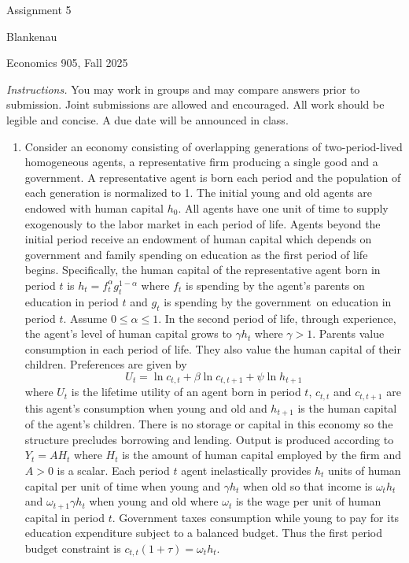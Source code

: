 \documentclass[12pt]{article}
\begin{document}
\begin{center}
{\LARGE Assignment 5}
\end{center}

\noindent Blankenau

\noindent Economics 905, Fall 2025

\noindent \textit{Instructions.} You may work in groups and may compare
answers prior to submission. Joint submissions are allowed and encouraged.
All work should be legible and concise. A due date will be announced in
class.\medskip

\begin{enumerate}
\item Consider an economy consisting of overlapping generations of
two-period-lived homogeneous agents, a representative firm producing a
single good and a government. A representative agent is born each period and
the population of each generation is normalized to 1. The initial young and
old agents are endowed with human capital $h_{0}.$ All agents have one unit
of time to supply exogenously to the labor market in each period of life.
Agents beyond the initial period receive an endowment of human capital which
depends on government and family spending on education as the first period
of life begins. Specifically, the human capital of the representative agent
born in period $t$ is $h_{t}=f_{t}^{\alpha }g_{t}^{1-\alpha }$ where $f_{t}$
is spending by the agent's parents on education in period $t$ and $g_{t}$ is
spending by the government\ on education in period $t$. Assume $0\leq \alpha
\leq 1.$ In the second period of life, through experience, the agent's level
of human capital grows to $\gamma h_{t}$ where $\gamma >1.$ Parents value
consumption in each period of life. They also value the human capital of
their children. Preferences are given by 
\begin{equation*}
U_{t}=\ln c_{t,t}+\beta \ln c_{t,t+1}+\psi \ln h_{t+1}
\end{equation*}%
where $U_{t}$ is the lifetime utility of an agent born in period $t$, $%
c_{t,t}$ and $c_{t,t+1}$ are this agent's consumption when young and old and 
$h_{t+1}$ is the human capital of the agent's children. There is no storage
or capital in this economy so the structure precludes borrowing and lending.
Output is produced according to $Y_{t}=AH_{t}$ where $H_{t}$ is the amount
of human capital employed by the firm and $A>0$ is a scalar. Each period $t$
agent inelastically provides $h_{t}$ units of human capital per unit of time
when young and $\gamma h_{t}$ when old so that income is $\omega _{t}h_{t}$
and $\omega _{t+1}\gamma h_{t}$ when young and old where $\omega _{t}$ is
the wage per unit of human capital in period $t$. Government taxes
consumption while young to  pay for its education expenditure subject to a
balanced budget. Thus the first period budget constraint is $c_{t,t}\left(
1+\tau \right) =\omega _{t}h_{t}.$


\end{enumerate}
\end{document}
